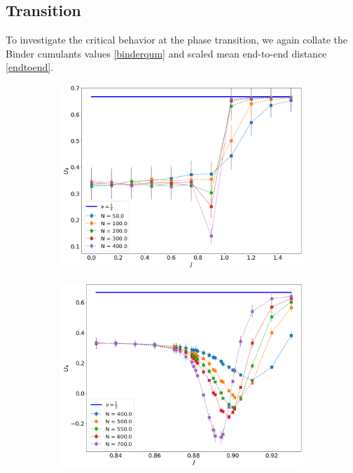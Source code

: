 \subsection{Transition}\label{Transition_3D}

To investigate the critical behavior at the phase transition, we again collate the Binder cumulants values \eqref{binderqum} and scaled mean end-to-end distance  \eqref{endtoend}.


 \begin{figure}[H]
	\centering
	\captionsetup{justification=centering}
	\begin{subfigure}[b]{0.45\textwidth}
		\includegraphics[width=\textwidth]{Images/3_bindercumulants_shortchains.png}
		\caption{  }
		\label{fig:bcshort_shortbc_3}
	\end{subfigure}
	\begin{subfigure}[b]{0.45\textwidth}
		\includegraphics[width=\textwidth]{Images/3_bindercumulants_longchains.png}

\end{subfigure}
\end{figure}

